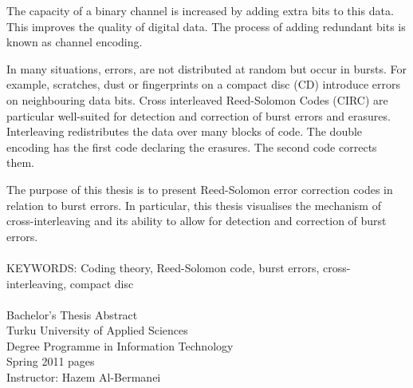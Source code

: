 \documentclass[../main.tex]{subfiles}
\begin{document}
The capacity of a binary channel is increased by adding extra bits to this data. This improves the quality of digital data. The process of adding redundant bits is known as channel encoding.

In many situations, errors, are not distributed at random but occur in bursts. For example, scratches, dust or fingerprints on a compact disc (CD) introduce errors on neighbouring data bits. Cross interleaved Reed-Solomon Codes (CIRC) are particular well-suited for detection and correction of burst errors and erasures. Interleaving redistributes the data over many blocks of code. The double encoding has the first code declaring the erasures. The second code corrects them.

The purpose of this thesis is to present Reed-Solomon error correction codes in relation to burst errors. In particular, this thesis visualises the mechanism of cross-interleaving and its ability to allow for detection and correction of burst errors.

\paragraph{}
KEYWORDS: Coding theory, Reed-Solomon code, burst errors, cross-inter\-leaving, compact disc

\paragraph{}
Bachelor's Thesis \textbar\space Abstract \\
Turku University of Applied Sciences \\
Degree Programme in Information Technology \\
Spring 2011 \textbar\space \pageref{LastPage} pages \\
Instructor: Hazem Al-Bermanei \\
\end{document}
